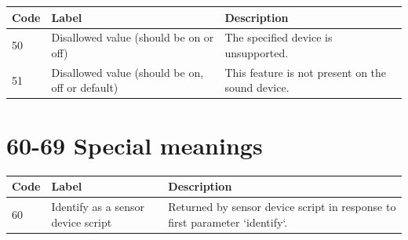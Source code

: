 \documentclass[
]{book}
\begin{document}
\begin{tabular}{l|l|l}
\hline
Code & Label & Description\\
\hline
50 & Disallowed value (should be on or off) & The specified device is unsupported.\\
\hline
51 & Disallowed value (should be on, off or default) & This feature is not present on the sound device.\\
\hline
\end{tabular}

\section{60-69 Special meanings}\label{special-meanings}

\begin{tabular}{l|l|l}
\hline
Code & Label & Description\\
\hline
60 & Identify as a sensor device script & Returned by sensor device script in response to first parameter `identify`.\\
\hline
\end{tabular}


\end{document}
